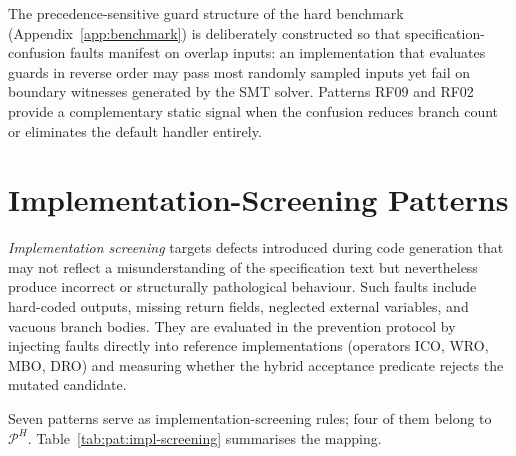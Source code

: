 The precedence-sensitive guard structure of the hard benchmark
(Appendix~\ref{app:benchmark}) is deliberately constructed so that
specification-confusion faults manifest on overlap inputs: an implementation
that evaluates guards in reverse order may pass most randomly sampled inputs
yet fail on boundary witnesses generated by the SMT solver.  Patterns RF09 and
RF02 provide a complementary static signal when the confusion reduces branch
count or eliminates the default handler entirely.

\section{Implementation-Screening Patterns}
\label{sec:pat:is}

\emph{Implementation screening} targets defects introduced during code
generation that may not reflect a misunderstanding of the specification text
but nevertheless produce incorrect or structurally pathological behaviour.
Such faults include hard-coded outputs, missing return fields, neglected
external variables, and vacuous branch bodies.  They are evaluated in the
prevention protocol by injecting faults directly into reference implementations
(operators ICO, WRO, MBO, DRO) and measuring whether the hybrid acceptance
predicate rejects the mutated candidate.

Seven patterns serve as implementation-screening rules; four of them belong to
$\mathcal{P}^H$.  Table~\ref{tab:pat:impl-screening} summarises the mapping.


